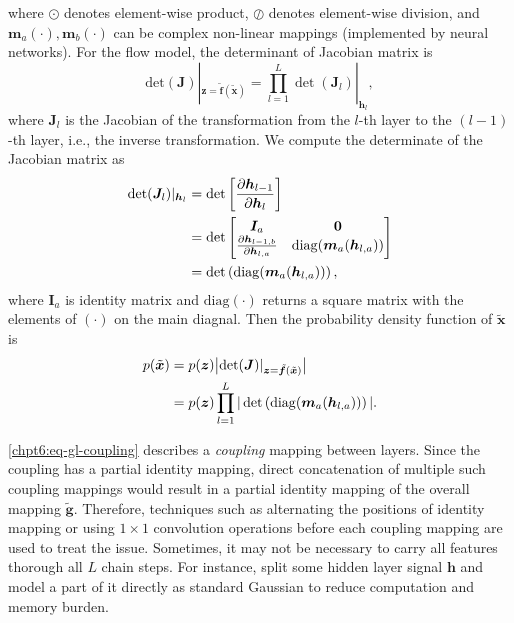 where $\odot$ denotes element-wise product, $\oslash$ denotes
element-wise division, and $\bm{m}_a(\cdot), \bm{m}_b(\cdot)$ can be
complex non-linear mappings (implemented by neural networks).
For the flow model, the determinant of Jacobian matrix is
\begin{equation}
  \mathrm{det}(\bm{J}) |_{\bm{z}=\tilde{\bm{f}}(\tilde{\bm{x}})} = \prod_{l=1}^L \det (\bm{J}_l) |_{\bm{h}_{l}},
\end{equation}
where $\bm{J}_l$ is the Jacobian of the transformation from the $l$-th layer to the $(l-1)$-th layer, i.e., the inverse transformation. We compute the determinate of the Jacobian matrix as
\begin{align}\label{eq-hl-determinate}
  \det (\bm{J}_l)|_{\bm{h}_{l}}& = \det \left[  \frac{ \partial \bm{h}_{l-1}}{\partial \bm{h}_l} \right] \nonumber\\
                               & = \det
                                 \begin{bmatrix}
                                   \bm{I}_a & \mathbf{0} \nonumber\\
                                   \frac{ \partial \bm{h}_{l-1,b}}{\partial \bm{h}_{l,a}} & \mathrm{diag}(\bm{m}_a(\bm{h}_{l,a}))
                                 \end{bmatrix}\nonumber\\
                               &= \det \left( \mathrm{diag}(\bm{m}_a(\bm{h}_{l,a})) \right),
\end{align}
where $\bm{I}_a$ is identity matrix and $\mathrm{diag}(\cdot)$ returns a square matrix with the elements of $(\cdot)$ on the main diagnal. Then the probability density function of $\tilde{\bm{x}}$ is
\begin{align}
  p(\tilde{\bm{x}}) & =  p(\bm{z}) \big| \mathrm{det}(\bm{J}) |_{\bm{z}=\tilde{\bm{f}}(\tilde{\bm{x}})}\big| \nonumber\\
                    &  = p(\bm{z}) \prod_{l=1}^L | \det\left( \mathrm{diag}(\bm{m}_a(\bm{h}_{l,a}))  \right) |.
\end{align}

\eqref{chpt6:eq-gl-coupling} describes a \textit{coupling} mapping between layers. Since the coupling has a partial identity mapping, direct concatenation of multiple such coupling mappings would result in a partial identity mapping of the overall mapping $\tilde{\bm{g}}$. Therefore, techniques such as alternating the positions of identity mapping \cite{2016arXiv160508803D} or using $1\times1$ convolution operations \cite{2018arXiv180703039K} before each coupling mapping are used to treat the issue.
Sometimes, it may not be necessary to carry all features thorough all $L$ chain steps. For instance, \cite{2016arXiv160508803D}\cite{2018arXiv180703039K} split some hidden
layer signal $\bm{h}$ and model a part of it directly as standard Gaussian to reduce computation and memory burden.

